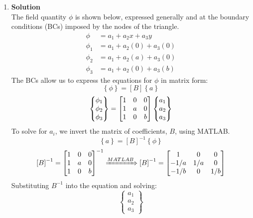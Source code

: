 \documentclass[12pt,letterpaper]{article}
\begin{document}
\begin{enumerate}[label=(\alph*)]
\begin{enumerate}[label=\arabic*.]
			\item{\textbf{Solution}} \\
			The field quantity $\phi$ is shown below, expressed generally and at the boundary conditions (BCs) imposed by the nodes of the triangle.
			\begin{align*}
				\phi &= a_1 + a_2x + a_3y\\
				\phi_1 &= a_1 + a_2(0) + a_3(0)\\
				\phi_2 &= a_1 + a_2(a) + a_3(0)\\
				\phi_3 &= a_1 + a_2(0) + a_3(b)		
			\end{align*}
			The BCs allow us to express the equations for $\phi$ in matrix form:
			\begin{equation*}
				\left\{\phi\right\} = \left[B\right]\left\{a\right\}
			\end{equation*}
			\begin{equation*}
				\begin{Bmatrix}
					\phi_1 \\ \phi_2 \\ \phi_3
				\end{Bmatrix}
				= \mqty[1 & 0 & 0 \\ 1 & a & 0 \\ 1 & 0 & b]
				\begin{Bmatrix}
					a_1 \\ a_2 \\ a_3
				\end{Bmatrix}
			\end{equation*}
			To solve for $a_i$, we invert the matrix of coefficients, $B$, using MATLAB.
			\begin{equation*}
				\left\{a\right\} = \left[B\right]^{-1}\left\{\phi\right\}
			\end{equation*}
			\begin{equation*}
				\left[B\right]^{-1} =  \mqty[1 & 0 & 0 \\ 1 & a & 0 \\ 1 & 0 & b]^{-1} \xRightarrow{MATLAB} \left[B\right]^{-1} = \mqty[1 & 0 & 0 \\ -1/a & 1/a & 0 \\ -1/b & 0 & 1/b]
			\end{equation*}
			Substituting $B^{-1}$ into the equation and solving:
			\begin{equation*}
				\begin{Bmatrix}
					a_1 \\ a_2 \\ a_3
				\end{Bmatrix}

\end{equation*}
\end{enumerate}
\end{enumerate}
\end{document}
